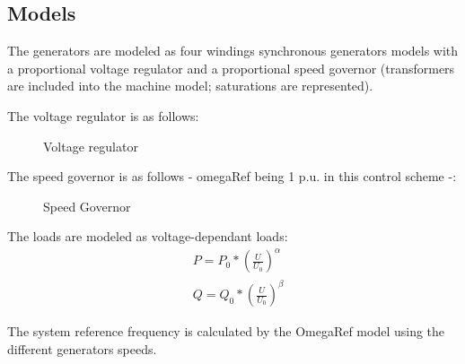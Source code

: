 \documentclass[a4paper, 12pt]{report}
\begin{document}
\subsection{Models}

The generators are modeled as four windings synchronous generators models with a proportional voltage regulator and a proportional speed governor (transformers are included into the machine model; saturations are represented).

The voltage regulator is as follows:
\begin{figure}[H]
\centering
{}
\caption{Voltage regulator}
\end{figure}

The speed governor is as follows - omegaRef being 1 p.u. in this control scheme -:
\begin{figure}[H]
\centering
{}
\caption{Speed Governor}
\end{figure}

The loads are modeled as voltage-dependant loads:
\begin{equation*}
\begin{aligned}
& P = P_{0} * (\frac{U}{U_{0}})^\alpha \\
& Q = Q_{0} * (\frac{U}{U_{0}})^\beta
\end{aligned}
\label{Voltage-dependant load model}
\end{equation*}

The system reference frequency is calculated by the OmegaRef model using the different generators speeds.\\
\end{document}
